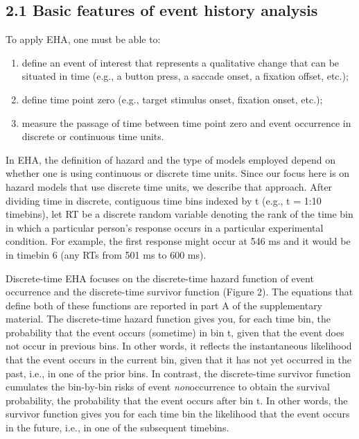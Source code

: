 \documentclass[
  man, donotrepeattitle,floatsintext]{apa6}
\begin{document}
\subsection{2.1 Basic features of event history analysis}\label{basic-features-of-event-history-analysis}

To apply EHA, one must be able to:

\begin{enumerate}
\def\labelenumi{\arabic{enumi}.}
\item
  define an event of interest that represents a qualitative change that can be situated in time (e.g., a button press, a saccade onset, a fixation offset, etc.);
\item
  define time point zero (e.g., target stimulus onset, fixation onset, etc.);
\item
  measure the passage of time between time point zero and event occurrence in discrete or continuous time units.
\end{enumerate}

In EHA, the definition of hazard and the type of models employed depend on whether one is using continuous or discrete time units. Since our focus here is on hazard models that use discrete time units, we describe that approach. After dividing time in discrete, contiguous time bins indexed by t (e.g., t = 1:10 timebins), let RT be a discrete random variable denoting the rank of the time bin in which a particular person's response occurs in a particular experimental condition. For example, the first response might occur at 546 ms and it would be in timebin 6 (any RTs from 501 ms to 600 ms).

Discrete-time EHA focuses on the discrete-time hazard function of event occurrence and the discrete-time survivor function (Figure 2). The equations that define both of these functions are reported in part A of the supplementary material. The discrete-time hazard function gives you, for each time bin, the probability that the event occurs (sometime) in bin t, given that the event does not occur in previous bins. In other words, it reflects the instantaneous likelihood that the event occurs in the current bin, given that it has not yet occurred in the past, i.e., in one of the prior bins. In contrast, the discrete-time survivor function cumulates the bin-by-bin risks of event \emph{non}occurrence to obtain the survival probability, the probability that the event occurs after bin t. In other words, the survivor function gives you for each time bin the likelihood that the event occurs in the future, i.e., in one of the subsequent timebins.
\end{document}

